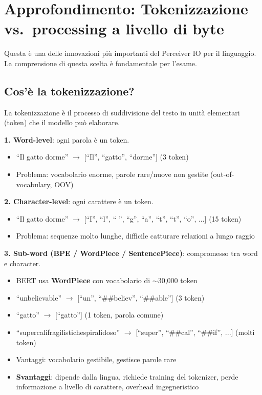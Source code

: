 \documentclass[12pt,a4paper]{article}
\begin{document}
\section{Approfondimento: Tokenizzazione vs.\ processing a livello di byte}

Questa \`e una delle innovazioni pi\`u importanti del Perceiver IO per il linguaggio. La comprensione di questa scelta \`e fondamentale per l'esame.

\subsection{Cos'\`e la tokenizzazione?}

La tokenizzazione \`e il processo di suddivisione del testo in unit\`a elementari (token) che il modello pu\`o elaborare.

\begin{formulabox}
\textbf{1. Word-level}: ogni parola \`e un token.
\begin{itemize}
    \item ``Il gatto dorme'' $\to$ [``Il'', ``gatto'', ``dorme''] (3 token)
    \item Problema: vocabolario enorme, parole rare/nuove non gestite (out-of-vocabulary, OOV)
\end{itemize}

\textbf{2. Character-level}: ogni carattere \`e un token.
\begin{itemize}
    \item ``Il gatto dorme'' $\to$ [``I'', ``l'', `` '', ``g'', ``a'', ``t'', ``t'', ``o'', ...] (15 token)
    \item Problema: sequenze molto lunghe, difficile catturare relazioni a lungo raggio
\end{itemize}

\textbf{3. Sub-word (BPE / WordPiece / SentencePiece)}: compromesso tra word e character.
\begin{itemize}
    \item BERT usa \textbf{WordPiece} con vocabolario di $\sim$30{,}000 token
    \item ``unbelievable'' $\to$ [``un'', ``\#\#believ'', ``\#\#able''] (3 token)
    \item ``gatto'' $\to$ [``gatto''] (1 token, parola comune)
    \item ``supercalifragilistichespiralidoso'' $\to$ [``super'', ``\#\#cal'', ``\#\#if'', ...] (molti token)
    \item Vantaggi: vocabolario gestibile, gestisce parole rare
    \item \textbf{Svantaggi}: dipende dalla lingua, richiede training del tokenizer, perde informazione a livello di carattere, overhead ingegneristico
\end{itemize}
\end{formulabox}
\end{document}
